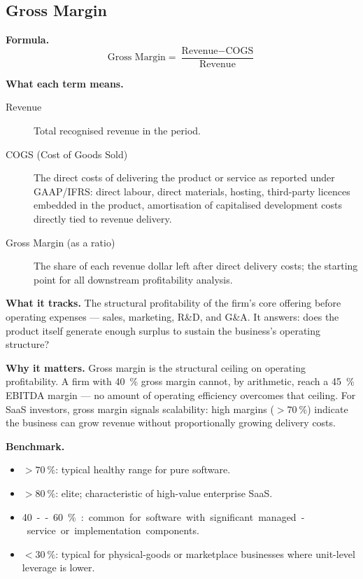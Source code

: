 \subsection{Gross Margin}

\textbf{Formula.}
\[
  \text{Gross Margin} = \frac{\text{Revenue} - \text{COGS}}{\text{Revenue}}
\]

\textbf{What each term means.}
\begin{description}
  \item[Revenue] Total recognised revenue in the period.
  \item[COGS (Cost of Goods Sold)] The direct costs of delivering the product or service as
    reported under GAAP/IFRS: direct labour, direct materials, hosting, third-party licences
    embedded in the product, amortisation of capitalised development costs directly tied to
    revenue delivery.
  \item[Gross Margin (as a ratio)] The share of each revenue dollar left after direct delivery
    costs; the starting point for all downstream profitability analysis.
\end{description}

\textbf{What it tracks.} The structural profitability of the firm's core offering before
operating expenses --- sales, marketing, R\&D, and G\&A. It answers: does the product itself
generate enough surplus to sustain the business's operating structure?

\textbf{Why it matters.} Gross margin is the structural ceiling on operating profitability.
A firm with \qty{40}{\percent} gross margin cannot, by arithmetic, reach a \qty{45}{\percent}
EBITDA margin --- no amount of operating efficiency overcomes that ceiling. For SaaS
investors, gross margin signals scalability: high margins ($>\qty{70}{\percent}$) indicate the
business can grow revenue without proportionally growing delivery costs.

\textbf{Benchmark.}
\begin{itemize}
  \item $>\qty{70}{\percent}$: typical healthy range for pure software.
  \item $>\qty{80}{\percent}$: elite; characteristic of high-value enterprise SaaS.
  \item \qty{40}--\qty{60}{\percent}: common for software with significant managed-service or
    implementation components.
  \item $<\qty{30}{\percent}$: typical for physical-goods or marketplace businesses where
    unit-level leverage is lower.
\end{itemize}

